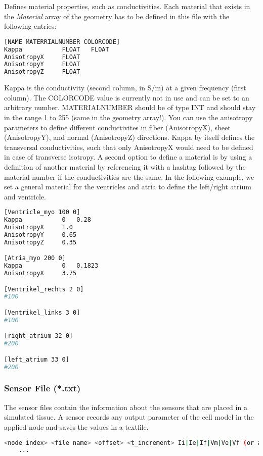 Defines material properties, such as conductivities.
Each material that exists in the \emph{Material} array of the geometry has to be defined in this file with the following entries:
\begin{lstlisting}[language=Bash,caption=acCELLerate material file (*.def)]
[NAME MATERRIALNUMBER COLORCODE]
Kappa           FLOAT	FLOAT
AnisotropyX     FLOAT
AnisotropyY		FLOAT
AnisotropyZ		FLOAT
\end{lstlisting}
Kappa is the conductivity (second column, in S/m) at a given frequency (first column).
The COLORCODE value is currently not in use and can be set to an arbitrary number.
MATERIALNUMBER should be of type INT and should stay in the range 1 to 255 (same in the geometry array!).
You can use the anisotropy parameters to define different conductivites in fiber (AnisotropyX), sheet (AnisotropyY), and normal (AnisotropyZ) directions.
Kappa by itself defines the transversal conductivities, such that only AnisotropyX would need to be defined in case of transverse isotropy.
A second option to define a material is by using a definition of another material by referencing it with a hashtag followed by the material number if the conductivities are the same.
In the following example, we set a general material for the ventricles and atria to define the left/right atrium and ventricle.
\begin{lstlisting}[language=Bash,caption=acCELLerate material file example]
[Ventricle_myo 100 0]
Kappa           0	0.28
AnisotropyX     1.0
AnisotropyY		0.65
AnisotropyZ		0.35

[Atria_myo 200 0]
Kappa           0	0.1823
AnisotropyX     3.75

[Ventrikel_rechts 2 0]
#100

[Ventrikel_links 3 0]
#100

[right_atrium 32 0]
#200

[left_atrium 33 0]
#200
\end{lstlisting}

\subsubsection{Sensor File (*.txt)}
\label{files:Sensor}

The sensor files contain the information about the sensors that are placed in a simulated tissue. 
A sensor records any output parameter of the cell model in the applied node and saves the values in a textfile.
\begin{lstlisting}[language=Bash,caption=acCELLerate sensor file (*.txt)]
    <node index> <file name> <offset> <t_increment> Ii|Ie|If|Vm|Ve|Vf (or any output parameter of the applied cellmodel)
    ...
\end{lstlisting}

